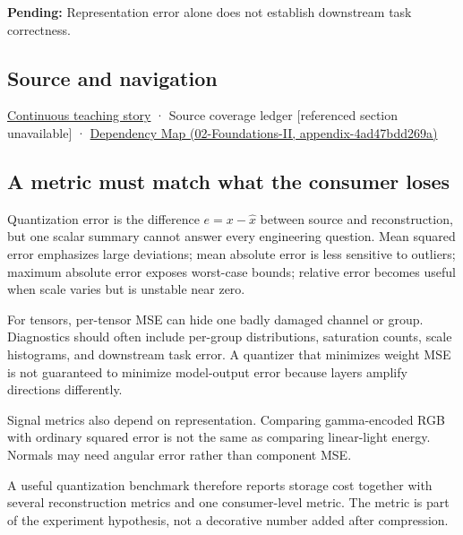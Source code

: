 \textbf{Pending:} Representation error alone does not establish downstream task correctness.

\subsection{Source and navigation}\label{appendix-537171d69d27-source-and-navigation}

\hyperref[01-foundations-i-ch001-choosing-what-information-to-keep]{Continuous teaching story} · {Source coverage ledger {[}referenced section unavailable{]}} · \href{../02-Foundations-II/main.pdf\#nameddest=appendix-4ad47bdd269a}{Dependency Map (02-Foundations-II, appendix-4ad47bdd269a)}

\subsection{A metric must match what the consumer loses}\label{appendix-537171d69d27-a-metric-must-match-what-the-consumer-loses}

Quantization error is the difference \(e=x-\hat x\) between source and reconstruction, but one scalar summary cannot answer every engineering question. Mean squared error emphasizes large deviations; mean absolute error is less sensitive to outliers; maximum absolute error exposes worst-case bounds; relative error becomes useful when scale varies but is unstable near zero.

For tensors, per-tensor MSE can hide one badly damaged channel or group. Diagnostics should often include per-group distributions, saturation counts, scale histograms, and downstream task error. A quantizer that minimizes weight MSE is not guaranteed to minimize model-output error because layers amplify directions differently.

Signal metrics also depend on representation. Comparing gamma-encoded RGB with ordinary squared error is not the same as comparing linear-light energy. Normals may need angular error rather than component MSE.

A useful quantization benchmark therefore reports storage cost together with several reconstruction metrics and one consumer-level metric. The metric is part of the experiment hypothesis, not a decorative number added after compression.
